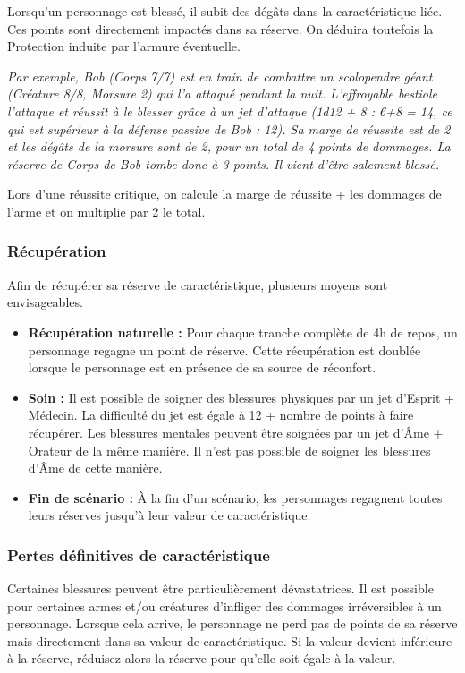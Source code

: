 Lorsqu'un personnage est blessé, il subit des dégâts dans la caractéristique liée. Ces points sont directement impactés dans sa réserve. On déduira toutefois la Protection induite par l'armure éventuelle.

\emph{Par exemple, Bob (Corps 7/7) est en train de combattre un scolopendre géant (Créature 8/8, Morsure 2) qui l'a attaqué pendant la nuit. L'effroyable bestiole l'attaque et réussit à le blesser grâce à un jet d'attaque (1d12 + 8 : 6+8 = 14, ce qui est supérieur à la défense passive de Bob : 12). Sa marge de réussite est de 2 et les dégâts de la morsure sont de 2, pour un total de 4 points de dommages. La réserve de Corps de Bob tombe donc à 3 points. Il vient d'être salement blessé.}

Lors d'une réussite critique, on calcule la marge de réussite + les dommages de l'arme et on multiplie par 2 le total.

\subsubsection*{Récupération}

Afin de récupérer sa réserve de caractéristique, plusieurs moyens sont envisageables.

\begin{itemize}
\item \textbf{Récupération naturelle :} Pour chaque tranche complète de 4h de repos, un personnage regagne un point de réserve. Cette récupération est doublée lorsque le personnage est en présence de sa source de réconfort.
\item \textbf{Soin :} Il est possible de soigner des blessures physiques par un jet d'Esprit + Médecin. La difficulté du jet est égale à 12 + nombre de points à faire récupérer. Les blessures mentales peuvent être soignées par un jet d'Âme + Orateur de la même manière. Il n'est pas possible de soigner les blessures d'Âme de cette manière.
\item \textbf{Fin de scénario :} À la fin d'un scénario, les personnages regagnent toutes leurs réserves jusqu'à leur valeur de caractéristique.
\end{itemize}

\subsubsection*{Pertes définitives de caractéristique}

Certaines blessures peuvent être particulièrement dévastatrices. Il est possible pour certaines armes et/ou créatures d'infliger des dommages irréversibles à un personnage. Lorsque cela arrive, le personnage ne perd pas de points de sa réserve mais directement dans sa valeur de caractéristique. Si la valeur devient inférieure à la réserve, réduisez alors la réserve pour qu'elle soit égale à la valeur.

